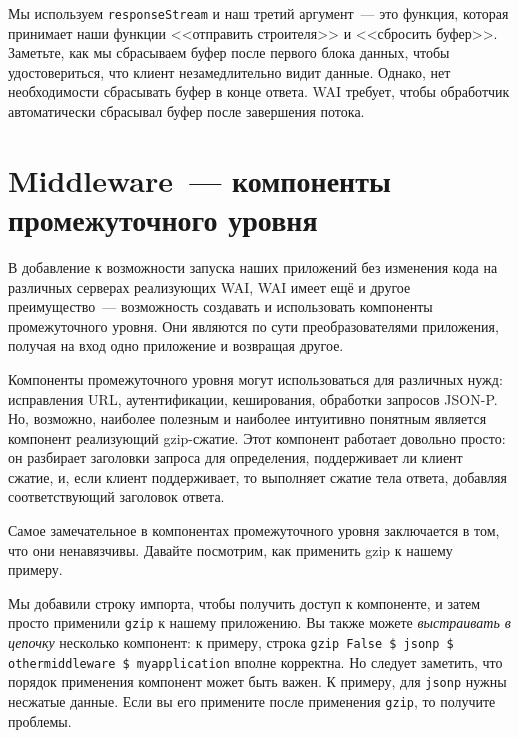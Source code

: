 
Мы используем \lstinline'responseStream' и наш третий аргумент~--- это функция,
которая принимает наши функции <<отправить строителя>> и <<сбросить буфер>>.
Заметьте, как мы сбрасываем буфер после первого блока данных, чтобы
удостовериться, что клиент незамедлительно видит данные. Однако, нет
необходимости сбрасывать буфер в конце ответа. WAI требует, чтобы обработчик
автоматически сбрасывал буфер после завершения потока.

\section {Middleware~--- компоненты промежуточного уровня}

В добавление к возможности запуска наших приложений без изменения кода на
различных серверах реализующих WAI, WAI имеет ещё и другое преимущество~---
возможность создавать и использовать компоненты промежуточного уровня. Они
являются по сути преобразователями приложения, получая на вход одно приложение
и возвращая другое.

Компоненты промежуточного уровня могут использоваться для различных нужд:
исправления URL, аутентификации, кеширования, обработки запросов JSON-P. Но,
возможно, наиболее полезным и наиболее интуитивно понятным является компонент
реализующий gzip-сжатие. Этот компонент работает довольно просто: он разбирает
заголовки запроса для определения, поддерживает ли клиент сжатие, и, если
клиент поддерживает, то выполняет сжатие тела ответа, добавляя соответствующий
заголовок ответа.

Самое замечательное в компонентах промежуточного уровня заключается в том, что
они ненавязчивы. Давайте посмотрим, как применить gzip к нашему примеру.


Мы добавили строку импорта, чтобы получить доступ к компоненте, и затем просто
применили \lstinline!gzip!  к нашему приложению. Вы также можете
\emph{выстраивать в цепочку} несколько компонент: к примеру, строка
\lstinline'gzip False $ jsonp $ othermiddleware $ myapplication' вполне
корректна. Но следует заметить, что порядок применения компонент может быть
важен. К примеру, для \lstinline!jsonp! нужны несжатые данные. Если вы его
примените после применения \lstinline!gzip!, то получите проблемы.
